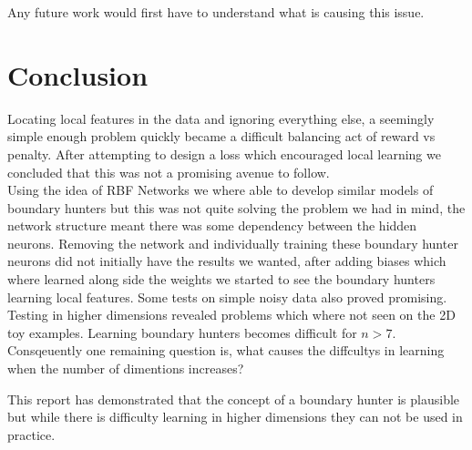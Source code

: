 \documentclass[notitlepage]{report}
\theoremstyle{definition}
\begin{document}
Any future work would first have to understand what is causing this issue. 

\chapter{Conclusion}
Locating local features in the data and ignoring everything else, a seemingly simple enough problem quickly became a difficult  balancing act of reward vs penalty. After attempting to design a loss which encouraged local learning we concluded that this was not a promising avenue to follow.\\

Using the idea of RBF Networks we where able to develop similar models of boundary hunters but this was not quite solving the problem we had in mind, the network structure meant there was some dependency between the hidden neurons. Removing the network and individually training these boundary hunter neurons did not initially have the results we wanted, after adding biases which where learned along side the weights we started to see the boundary hunters learning local features. Some tests on simple noisy data also proved promising.\\

Testing in higher dimensions revealed problems which where not seen on the 2D toy examples. Learning boundary hunters becomes difficult for $n > 7$. Consqeuently one remaining question is, what causes the diffcultys in learning when the number of dimentions increases?

This report has demonstrated that the concept of a boundary hunter is plausible but while there is difficulty learning in higher dimensions they can not be used in practice.


\newpage


\end{document}
